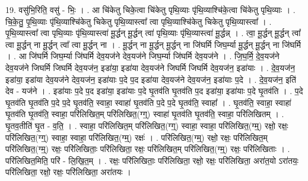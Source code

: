 \documentclass[17pt]{extarticle}
\begin{document}
19. वसु॑भि॒रिति॒ वसु॑ - भिः॒ । . आ चि॑केतु चिके॒त्वा चि॑केतु पृथि॒व्याः पृ॑थि॒व्याश्चि॑के॒त्वा चि॑केतु पृथि॒व्याः । . चि॒के॒तु॒ पृ॒थि॒व्याः पृ॑थि॒व्याश्चि॑केतु चिकेतु पृथि॒व्यास्त्वा᳚ त्वा पृथि॒व्याश्चि॑केतु चिकेतु पृथि॒व्यास्त्वा᳚ । . पृ॒थि॒व्यास्त्वा᳚ त्वा पृथि॒व्याः पृ॑थि॒व्यास्त्वा॑ मू॒र्द्धन् मू॒र्द्धन् त्वा॑ पृथि॒व्याः पृ॑थि॒व्यास्त्वा॑ मू॒र्द्धन्न् । . त्वा॒ मू॒र्द्धन् मू॒र्द्धन् त्वा᳚ त्वा मू॒र्द्धन् ना मू॒र्द्धन् त्वा᳚ त्वा मू॒र्द्धन् ना । . मू॒र्द्धन् ना मू॒र्द्धन् मू॒र्द्धन् ना जि॑घर्मि जिघ॒र्म्या मू॒र्द्धन् मू॒र्द्धन् ना जि॑घर्मि । . आ जि॑घर्मि जिघ॒र्म्या जि॑घर्मि देव॒यज॑ने देव॒यज॑ने जिघ॒र्म्या जि॑घर्मि देव॒यज॑ने । . जि॒घ॒र्मि॒ दे॒व॒यज॑ने देव॒यज॑ने जिघर्मि जिघर्मि देव॒यज॑न॒ इडा॑या॒ इडा॑या देव॒यज॑ने जिघर्मि जिघर्मि देव॒यज॑न॒ इडा॑याः । . दे॒व॒यज॑न॒ इडा॑या॒ इडा॑या देव॒यज॑ने देव॒यज॑न॒ इडा॑याः प॒दे प॒द इडा॑या देव॒यज॑ने देव॒यज॑न॒ इडा॑याः प॒दे । . दे॒व॒यज॑न॒ इति॑ देव - यज॑ने । . इडा॑याः प॒दे प॒द इडा॑या॒ इडा॑याः प॒दे घृ॒तव॑ति घृ॒तव॑ति प॒द इडा॑या॒ इडा॑याः प॒दे घृ॒तव॑ति । . प॒दे घृ॒तव॑ति घृ॒तव॑ति प॒दे प॒दे घृ॒तव॑ति॒ स्वाहा॒ स्वाहा॑ घृ॒तव॑ति प॒दे प॒दे घृ॒तव॑ति॒ स्वाहा᳚ । . घृ॒तव॑ति॒ स्वाहा॒ स्वाहा॑ घृ॒तव॑ति घृ॒तव॑ति॒ स्वाहा॒ परि॑लिखित॒म् परि॑लिखित॒(ग्ग्॒) स्वाहा॑ घृ॒तव॑ति घृ॒तव॑ति॒ स्वाहा॒ परि॑लिखितम् । . घृ॒तव॒तीति॑ घृ॒त - व॒ति॒ । . स्वाहा॒ परि॑लिखित॒म् परि॑लिखित॒(ग्ग्॒) स्वाहा॒ स्वाहा॒ परि॑लिखित॒(ग्म्॒) रक्षो॒ रक्षः॒ परि॑लिखित॒(ग्ग्॒) स्वाहा॒ स्वाहा॒ परि॑लिखित॒(ग्म्॒) रक्षः॑ । . परि॑लिखित॒(ग्म्॒) रक्षो॒ रक्षः॒ परि॑लिखित॒म् परि॑लिखित॒(ग्म्॒) रक्षः॒ परि॑लिखिताः॒ परि॑लिखिता॒ रक्षः॒ परि॑लिखित॒म् परि॑लिखित॒(ग्म्॒) रक्षः॒ परि॑लिखिताः । . परि॑लिखित॒मिति॒ परि॑ - लि॒खि॒त॒म् । . रक्षः॒ परि॑लिखिताः॒ परि॑लिखिता॒ रक्षो॒ रक्षः॒ परि॑लिखिता॒ अरा॑त॒यो ऽरा॑तयः॒ परि॑लिखिता॒ रक्षो॒ रक्षः॒ परि॑लिखिता॒ अरा॑तयः । \newline
\end{document}
